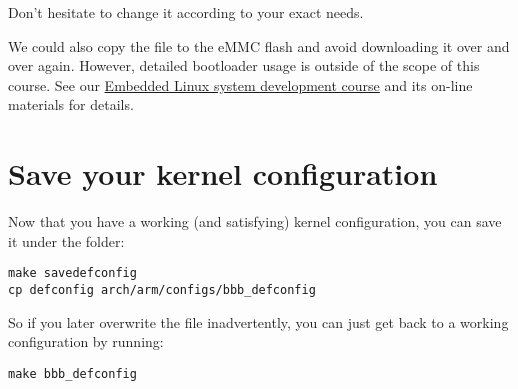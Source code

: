 Don't hesitate to change it according to your exact needs.

We could also copy the  file to the eMMC flash and avoid
downloading it over and over again. However, detailed bootloader
usage is outside of the scope of this course. See our
\href{https://bootlin.com/training/embedded-linux/}{Embedded
Linux system development course} and its on-line materials for
details.

\section{Save your kernel configuration}

Now that you have a working (and satisfying) kernel configuration, you
can save it under the  folder:

{\scriptsize
\begin{verbatim}
make savedefconfig
cp defconfig arch/arm/configs/bbb_defconfig
\end{verbatim}
}

So if you later overwrite the  file inadvertently, you can
just get back to a working configuration by running:

{\scriptsize
\begin{verbatim}
make bbb_defconfig
\end{verbatim}
}
